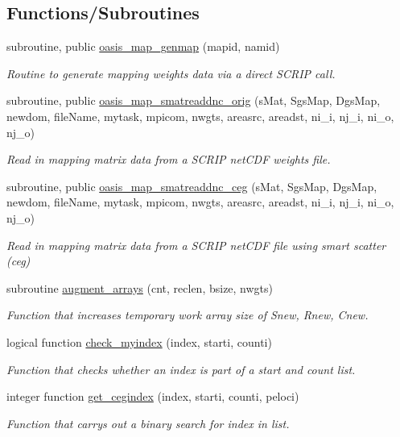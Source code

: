 \subsection*{Functions/\+Subroutines}
\begin{DoxyCompactItemize}
\item 
subroutine, public \hyperlink{namespacemod__oasis__map_a6f27846fb1dcb2db3095b9ace4fa3c5b}{oasis\+\_\+map\+\_\+genmap} (mapid, namid)
\begin{DoxyCompactList}\small\item\em Routine to generate mapping weights data via a direct S\+C\+R\+IP call. \end{DoxyCompactList}\item 
subroutine, public \hyperlink{namespacemod__oasis__map_acbe7b9e25c19dbbd2fbebd3895a87d64}{oasis\+\_\+map\+\_\+smatreaddnc\+\_\+orig} (s\+Mat, Sgs\+Map, Dgs\+Map, newdom, file\+Name, mytask, mpicom, nwgts, areasrc, areadst, ni\+\_\+i, nj\+\_\+i, ni\+\_\+o, nj\+\_\+o)
\begin{DoxyCompactList}\small\item\em Read in mapping matrix data from a S\+C\+R\+IP net\+C\+DF weights file. \end{DoxyCompactList}\item 
subroutine, public \hyperlink{namespacemod__oasis__map_a3345e2fc3d74cc1221d6c6d993233990}{oasis\+\_\+map\+\_\+smatreaddnc\+\_\+ceg} (s\+Mat, Sgs\+Map, Dgs\+Map, newdom, file\+Name, mytask, mpicom, nwgts, areasrc, areadst, ni\+\_\+i, nj\+\_\+i, ni\+\_\+o, nj\+\_\+o)
\begin{DoxyCompactList}\small\item\em Read in mapping matrix data from a S\+C\+R\+IP net\+C\+DF file using smart scatter (ceg) \end{DoxyCompactList}\item 
subroutine \hyperlink{namespacemod__oasis__map_a84a573c180be2a5dc8a14fd18b2dc4b7}{augment\+\_\+arrays} (cnt, reclen, bsize, nwgts)
\begin{DoxyCompactList}\small\item\em Function that increases temporary work array size of Snew, Rnew, Cnew. \end{DoxyCompactList}\item 
logical function \hyperlink{namespacemod__oasis__map_a2528f60bde618dd4840d3adb5a569996}{check\+\_\+myindex} (index, starti, counti)
\begin{DoxyCompactList}\small\item\em Function that checks whether an index is part of a start and count list. \end{DoxyCompactList}\item 
integer function \hyperlink{namespacemod__oasis__map_a8889e0dcab8e1e894d3203c480110bed}{get\+\_\+cegindex} (index, starti, counti, peloci)
\begin{DoxyCompactList}\small\item\em Function that carrys out a binary search for index in list. \end{DoxyCompactList}\end{DoxyCompactItemize}

